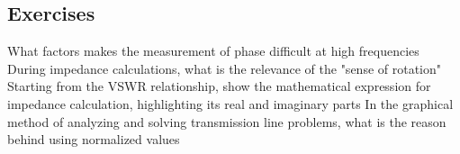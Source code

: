 \begin{mdframed}[ backgroundcolor=lightblue, linewidth=1pt, hidealllines=true]
\section*{Exercises}
\begin{ExerciseList}
\Exercise[label={ex91}]
What factors makes the measurement of phase difficult at high frequencies
\Exercise[label={ex91}]
During impedance calculations, what is the relevance of the "sense of rotation"
\Exercise[label={ex91}]
Starting from the VSWR relationship, show the mathematical expression for impedance calculation, highlighting its real and imaginary parts
\Exercise[label={ex91}]
In the graphical method of analyzing and solving transmission line problems, what is the reason behind using normalized values
\end{ExerciseList}
\end{mdframed}